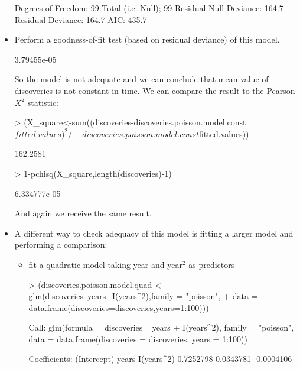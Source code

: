 \documentclass[a4paper]{article}
\begin{document}
\begin{itemize}
\begin{Schunk}
\begin{Soutput}
Degrees of Freedom: 99 Total (i.e. Null);  99 Residual
Null Deviance:	    164.7 
Residual Deviance: 164.7 	AIC: 435.7
\end{Soutput}
\end{Schunk}
\item Perform a goodness-of-fit test (based on residual deviance) of this model.
\begin{Schunk}
\begin{Soutput}
[1] 3.79455e-05
\end{Soutput}
\end{Schunk}
So the model is not adequate and we can conclude that mean value of discoveries
is not constant in time.
We can compare the result to the Pearson $X^2$ statistic:
\begin{Schunk}
\begin{Sinput}
> (X_square<-sum((discoveries-discoveries.poisson.model.const$fitted.values)^2/
+ 							discoveries.poisson.model.const$fitted.values))
\end{Sinput}
\begin{Soutput}
[1] 162.2581
\end{Soutput}
\begin{Sinput}
> 1-pchisq(X_square,length(discoveries)-1)	
\end{Sinput}
\begin{Soutput}
[1] 6.334777e-05
\end{Soutput}
\end{Schunk}
And again we receive the same result.
\item A different way to check adequacy of this model is fitting a larger model
and performing a comparison:
\begin{itemize}
\item fit a quadratic model taking year and year$^2$ as predictors
\begin{Schunk}
\begin{Sinput}
> (discoveries.poisson.model.quad <- glm(discoveries~years+I(years^2),family = "poisson",
+ 					data = data.frame(discoveries=discoveries,years=1:100)))
\end{Sinput}
\begin{Soutput}
Call:  glm(formula = discoveries ~ years + I(years^2), family = "poisson", 
    data = data.frame(discoveries = discoveries, years = 1:100))

Coefficients:
(Intercept)        years   I(years^2)  
  0.7252798    0.0343781   -0.0004106  


\end{Soutput}
\end{Schunk}
\end{itemize}
\end{itemize}
\end{document}
